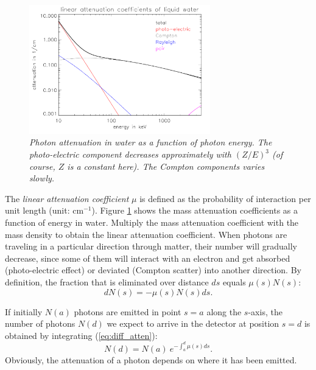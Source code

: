 \documentclass[11pt,oneside]{article}
\begin{document}
\begin{figure}[tb]
\centering
\includegraphics[width=0.7\textwidth]{figs/fig_atten_water.pdf}
\caption{\label{fig:atten_water} \emph{Photon attenuation in water as a
function of photon energy. The photo-electric component decreases
approximately with $(Z/E)^3$ (of course, $Z$ is a constant here). The Compton
components varies slowly.}}
\end{figure}

The {\em linear attenuation coefficient} $\mu$ is defined as the
probability of interaction per unit length (unit: cm$^{-1}$). Figure
\ref{fig:atten_water} shows the mass attenuation coefficients as a
function of energy in water. Multiply the mass attenuation coefficient
with the mass density to obtain the linear attenuation
coefficient. When photons are traveling in a particular direction
through matter, their number will gradually decrease, since some of
them will interact with an electron and get absorbed (photo-electric
effect) or deviated (Compton scatter) into another direction. By
definition, the fraction that is eliminated over distance $ds$ equals
$\mu(s) N(s)$:
\begin{equation}
  dN(s) = - \mu(s) N(s) ds. \label{eq:diff_atten}
\end{equation}

If initially $N(a)$ photons are emitted in point $s = a$ along the $s$-axis,
the number of photons $N(d)$ we expect to arrive in the detector at position
$s = d$ is obtained by integrating (\ref{eq:diff_atten}):
\begin{equation}
  N(d) = N(a) \  e^{- \int_a^d \mu(s) ds}. 
\label{jn:spectatten}
\end{equation}
Obviously, the attenuation of a photon depends on where it has been emitted.
\end{document}

